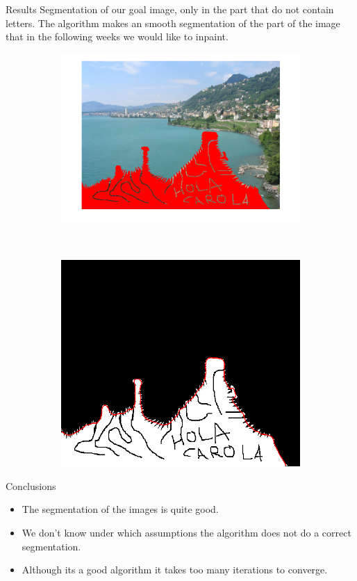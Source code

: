 \documentclass[11pt]{beamer}
\begin{document}
\begin{frame}{Results}
Segmentation of our goal image, only in the part that do not contain letters. The algorithm makes an smooth segmentation of the part of the image that in the following weeks we would like to inpaint.
\begin{figure}
    \centering
    \begin{subfigure}[b]{0.5\textwidth}
        \includegraphics[width=\textwidth]{Goal_Image_inpainted}

    \end{subfigure}
    ~ 
        \begin{subfigure}[b]{0.4\textwidth}
        \includegraphics[width=\textwidth]{Goal_Image_segmented}

    \end{subfigure}

\end{figure}

\href{run:videos/Goal_Image.avi}{\color{red}{Video of the segmentation}}
\end{frame}

\begin{frame}{Conclusions}
\begin{itemize}
\item The segmentation of the images is quite good.
\item We don't know under which assumptions the algorithm does not do a correct segmentation.
\item Although its a good algorithm it takes too many iterations to converge.
\end{itemize}
\end{frame}
\end{document}

